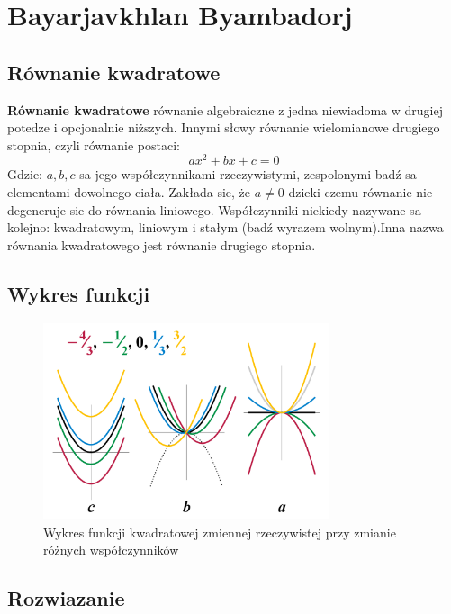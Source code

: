 \section{Bayarjavkhlan Byambadorj}
\label{sec:Maks}

\subsection{Równanie kwadratowe}

    \textbf{Równanie kwadratowe} równanie algebraiczne z jedna niewiadoma w drugiej potedze i opcjonalnie niższych. Innymi słowy równanie wielomianowe drugiego stopnia, czyli równanie postaci: \[ax^{2}+bx+c = 0\]
    Gdzie: $a,b,c$ sa jego współczynnikami rzeczywistymi, zespolonymi badź sa elementami dowolnego ciała. Zakłada sie, że \(a\neq0\) dzieki czemu równanie nie degeneruje sie do równania liniowego. Współczynniki niekiedy nazywane sa kolejno: kwadratowym, liniowym i stałym (badź wyrazem wolnym).Inna nazwa równania kwadratowego jest równanie drugiego stopnia.

\subsection{Wykres funkcji}

    \begin{figure}[h]
        \centering
        \includegraphics[width=0.75\textwidth]{pictures/Quadratic_equation_coefficients.png}
        \caption{Wykres funkcji kwadratowej zmiennej rzeczywistej przy zmianie różnych współczynników}
        \label{fig:mesh1}
    \end{figure}
    
\newpage
\subsection{Rozwiazanie}

